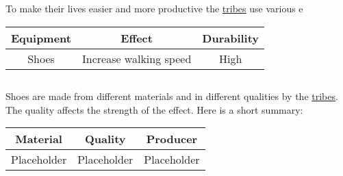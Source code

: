 \section{}\label{ch:Goods:Equipment} %
To make their lives easier and more productive the \hyperref[ch:Tribes]{tribes} use various e
\begin{longtable}{ccc}
	\toprule
	\Gls*{Equipment} & Effect                 & Durability \\
	\midrule
	\Glspl{Shoe}     & Increase walking speed & High       \\
	\bottomrule
\end{longtable}

\subsection{}
\Glspl{Shoe} are made from different materials and in different qualities by the
\hyperref[ch:Tribes]{tribes}. The quality affects the strength of the effect. Here is a short summary:

\begin{longtable}{ccc}
	\toprule
	Material    & Quality     & Producer    \\
	\midrule
	Placeholder & Placeholder & Placeholder \\
	\bottomrule
\end{longtable}

